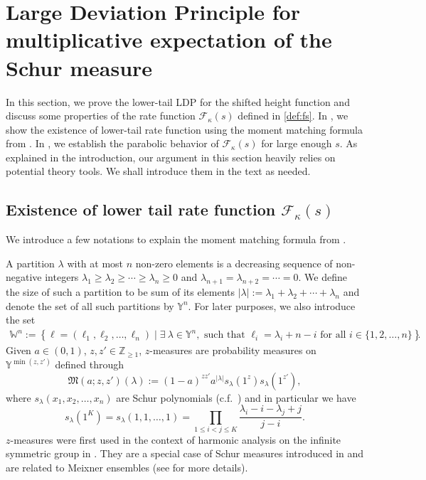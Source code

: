 \documentclass[reqno,11pt]{amsart}
\numberwithin{equation}{section}
\theoremstyle{definition}
\newcommand{\Z}{\mathbb{Z}}
\begin{document}
\section{Large Deviation Principle for multiplicative expectation of the Schur measure}\label{sec: LDP_schur}

In this section, we prove the lower-tail LDP for the shifted height function and discuss some properties of the rate function $\mathcal{F}_\kappa(s)$ defined in \eqref{def:fs}. In , we show the existence of lower-tail rate function using the moment matching formula from \cite{borodin2016stochastic_MM}. In , we establish the parabolic behavior of $\mathcal{F}_\kappa(s)$ for large enough $s$. As explained in the introduction, our argument in this section heavily relies on potential theory tools. We shall introduce them in the text as needed.


\subsection{Existence of lower tail rate function $\mathcal{F}_\kappa(s)$} \label{sec.2.1} We introduce a few notations to explain the moment matching formula from \cite{borodin2016stochastic_MM}. 

A partition $\lambda$ with at most $n$ non-zero elements is a decreasing sequence of non-negative integers $\lambda_1 \ge \lambda_2 \ge \cdots \ge\lambda_n \ge 0$ and $\lambda_{n+1}=\lambda_{n+2}=\cdots=0$. We define the size of such a partition to be sum of its elements $|\lambda|:=\lambda_1+\lambda_2+\cdots+\lambda_n$ and denote the set of all such partitions by $\mathbb{Y}^n$. For later purposes, we also introduce the set
\begin{align}
    \label{defwn}
    \mathbb{W}^n := \left\{\ell =(\ell_1,\ell_2,\ldots,\ell_n) \mid \exists \ \lambda\in \mathbb{Y}^n, \mbox{ such that } \ell_i=\lambda_i+n-i \mbox{ for all } i\in \{1,2,\ldots,n\}\right\}.
\end{align}
Given $a\in (0,1)$, $z,z'\in \Z_{\ge 1}$, $z$-measures are probability measures on $\mathbb{Y}^{\min(z,z')}$ defined through
\begin{equation}\label{eq:schurmeasure}
    \mathfrak{M}(a;z,z')(\lambda):= (1-a)^{zz'}a^{|\lambda|}s_\lambda(1^z)s_\lambda(1^{z'}),
\end{equation}
where $s_{\lambda}(x_1,x_2,\ldots,x_n)$ are Schur polynomials (c.f.~\cite{Macdonald1995}) and in particular we have 
\begin{equation*}
    s_\lambda(1^{K})=s_{\lambda}(1,1,\ldots,1) = \prod_{1\leq i<j\leq K}\frac{\lambda_i-i-\lambda_j+j}{j-i}.
\end{equation*}
$z$-measures were first used in the context of harmonic
analysis on the infinite symmetric group in \cite{Kerov1993}. They are a special case of Schur measures introduced in \cite{okounkov2001infinite} and  are related to Meixner ensembles (see \cite{johansson2000shape} for more details).  
\end{document}
